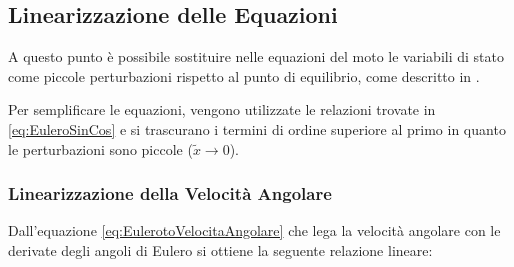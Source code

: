 \subsection{Linearizzazione delle Equazioni}
A questo punto è possibile sostituire nelle equazioni del moto le variabili di stato come piccole perturbazioni rispetto al punto di equilibrio, come descritto in \cite{zampieri_dispensa_controlli}.

Per semplificare le equazioni, vengono utilizzate le relazioni trovate in \eqref{eq:EuleroSinCos} e si trascurano i termini di ordine superiore al primo in quanto le perturbazioni sono piccole ($\widetilde{x} \rightarrow 0$).

\subsubsection{Linearizzazione della Velocità Angolare}
Dall'equazione \eqref{eq:EulerotoVelocitaAngolare} che lega la velocità angolare con le derivate degli angoli di Eulero si ottiene la seguente relazione lineare:

